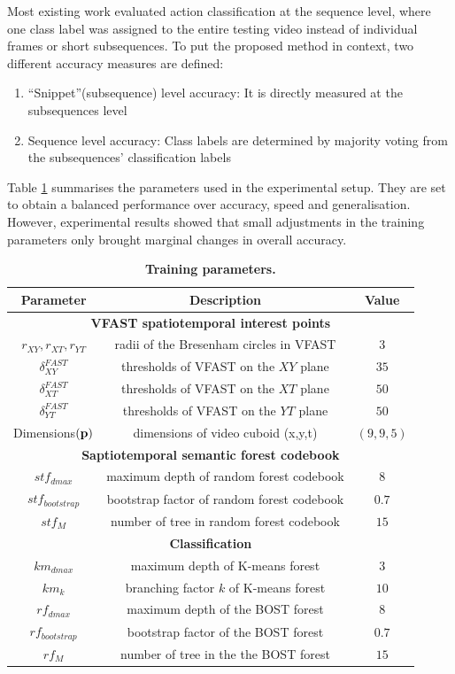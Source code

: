 Most existing work evaluated action classification at the sequence level, where one class label was assigned to the entire testing video instead of individual frames or short subsequences. 
To put the proposed method in context, two different accuracy measures are defined: 
\begin{enumerate}
\item ``Snippet''(subsequence) level accuracy: It is directly measured at the subsequences level 
\item Sequence level accuracy: Class labels are determined by majority voting from the subsequences' classification labels 
\end{enumerate}

Table \ref{tab/act/exparam} summarises the parameters used in the experimental setup. They are set to obtain a balanced performance over accuracy, speed and generalisation. However, experimental results showed that small adjustments in the training parameters only brought marginal changes in overall accuracy. 
\begin{table}
\centering
\begin{tabular}{|c|c|c|}
\hline
\textbf{Parameter} & \textbf{Description} & \textbf{Value} \\
\hline
\multicolumn{3}{|c|}{\textbf{VFAST spatiotemporal interest points}}\\
\hline
$r_{XY}, r_{XT}, r_{YT}$ & radii of the Bresenham circles in VFAST & $3$ \\
$\delta^{FAST}_{XY}$ & thresholds of VFAST on the $XY$ plane& $35$\\
$\delta^{FAST}_{XT}$ & thresholds of VFAST on the $XT$ plane& $50$\\
$\delta^{FAST}_{YT}$ & thresholds of VFAST on the $YT$ plane& $50$\\
Dimensions$(\mathbf{p})$ & dimensions of video cuboid (x,y,t)& $(9,9,5)$ \\
\hline
\multicolumn{3}{|c|}{\textbf{Saptiotemporal semantic forest codebook}}\\
\hline
$stf_{dmax}$ & maximum depth of random forest codebook & $8$ \\
$stf_{bootstrap}$ & bootstrap factor of random forest codebook & $0.7$ \\
$stf_M$ & number of tree in random forest codebook & $15$ \\
\hline
\multicolumn{3}{|c|}{\textbf{Classification}} \\
\hline
$km_{dmax}$ & maximum depth of K-means forest & $3$ \\
$km_k$ & branching factor $k$ of K-means forest & $10$ \\
$rf_{dmax}$ & maximum depth of the BOST forest & $8$ \\
$rf_{bootstrap}$ & bootstrap factor of the BOST forest& $0.7$ \\
$rf_M$ & number of tree in the the BOST forest& $15$ \\ 
\hline
\end{tabular}
\caption{\textbf{Training parameters.}}
\label{tab/act/exparam}
\end{table}


